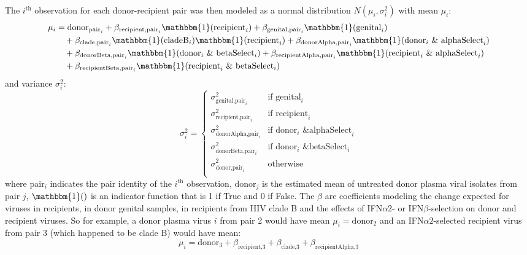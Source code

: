 \documentclass[12pt]{article}
\newcommand{\ifna}{IFN${\alpha 2}$}
\newcommand{\ifnb}{IFN${\beta}$}
\begin{document}
The $i^\text{th}$ observation for each donor-recipient pair was then modeled as a normal distribution $N(\mu_i,\sigma^2_i)$ with mean $\mu_i$:
\begin{align*}
  \mu_i&= \text{donor}_{\text{pair}_i} + \beta_{\text{recipient,pair}_i} \mathbbm{1}(\text{recipient}_i) + \beta_{\text{genital,pair}_i} \mathbbm{1}(\text{genital}_i)\\
  &\quad+ \beta_{\text{clade,pair}_i} \mathbbm{1}(\text{cladeB}_i)\mathbbm{1}(\text{recipient}_i) + \beta_{\text{donorAlpha,pair}_i} \mathbbm{1}(\text{donor}_i \text{ \& alphaSelect}_i)\\
  &\quad + \beta_{\text{donorBeta,pair}_i} \mathbbm{1}(\text{donor}_i \text{ \& betaSelect}_i) + \beta_{\text{recipientAlpha,pair}_i} \mathbbm{1}(\text{recipient}_i\text{ \& alphaSelect}_i)\\
  &\quad+ \beta_{\text{recipientBeta,pair}_i} \mathbbm{1}(\text{recipient}_i \text{ \& betaSelect}_i) \\
\end{align*}
and variance $\sigma^2_i$:
\[
  \sigma^2_i = \begin{cases}
    \sigma^2_{\text{genital,pair}_i} & \text{if } \text{genital}_i\\
    \sigma^2_{\text{recipient,pair}_i} & \text{if } \text{recipient}_i\\
    \sigma^2_{\text{donorAlpha,pair}_i} & \text{if } \text{donor}_i \text{ \& alphaSelect}_i\\
    \sigma^2_{\text{donorBeta,pair}_i} & \text{if } \text{donor}_i \text{ \& betaSelect}_i\\
    \sigma^2_{\text{donor,pair}_i} & \text{otherwise}\\
  \end{cases}
\]
where pair$_i$ indicates the pair identity of the $i^\text{th}$ observation,
  $\text{donor}_j$ is the estimated mean of untreated donor plasma viral isolates from pair $j$,
  $\mathbbm{1}()$ is an indicator function that is 1 if True and 0 if False.
  The $\beta$ are coefficients modeling the change expected for viruses in recipients, in donor genital samples,
  in recipients from HIV clade B and the effects of \ifna{}- or \ifnb{}-selection on donor and recipient viruses.
  So for example, a donor plasma virus $i$ from pair 2 would have mean $\mu_i = \text{donor}_{2}$
  and an \ifna{}-selected recipient virus from pair 3 (which happened to be clade B) would have mean:
\[\mu_i=\text{donor}_{3} + \beta_{\text{recipient,3}} + \beta_{\text{clade,3}} + \beta_{\text{recipientAlpha,3}}\]
\end{document}
